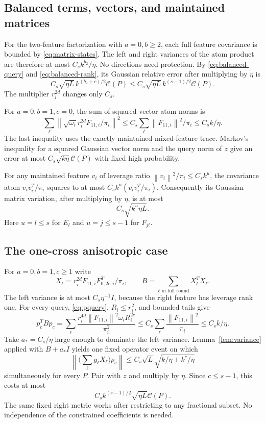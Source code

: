 \documentclass[11pt]{article}
\theoremstyle{remark}\newtheorem{remark}[theorem]{Remark}
\newcommand{\norm}[1]{\left\|#1\right\|}\newcommand{\ip}[2]{\left\langle #1,#2\right\rangle}
\newcommand{\cost}{\mathcal C}\newcommand{\OPT}{\mathsf{OPT}}
\begin{document}
\subsection{Balanced terms, vectors, and maintained matrices}
For the two-feature factorization with $a=0,b\ge2$, each full feature covariance is bounded by \eqref{eq:matrix-states}. The left and right variances of the atom product are therefore at most $C_s k^{b_2}/\eta$. No directions need protection. By \eqref{eq:balanced-query} and \eqref{eq:balanced-rank}, its Gaussian relative error after multiplying by $\eta$ is
\begin{equation}\label{eq:balanced-error}
 C_s\sqrt{\eta L}\,k^{(b_2+c)/2}\cost(P)
 \le C_s\sqrt{\eta L}\,k^{(s-1)/2}\cost(P).
\end{equation}
The multiplier $r_i^{2d}$ changes only $C_s$.

For $a=0,b=1,c=0$, the sum of squared vector-atom norms is
\[
 \sum_\ell\norm{\sqrt{\omega_i}r_i^{2d}F_{11,i}/\pi_i}^2
 \le C_s\sum_\ell\norm{F_{11,i}}^2/\pi_i\le C_s k/\eta.
\]
The last inequality uses the exactly maintained mixed-feature trace. Markov's inequality for a squared Gaussian vector norm and the query norm of $z$ give an error at most $C_s\sqrt{k\eta}\cost(P)$ with fixed high probability.

For any maintained feature $v_i$ of leverage ratio $\norm{v_i}^2/\pi_i\le C_s k^u$, the covariance atom $v_iv_i^T/\pi_i$ squares to at most $C_s k^u(v_iv_i^T/\pi_i)$. Consequently its Gaussian matrix variation, after multiplying by $\eta$, is at most
\begin{equation}\label{eq:state-drift}
 C_s\sqrt{k^u\eta L}.
\end{equation}
Here $u=l\le s$ for $E_l$ and $u=j\le s-1$ for $F_{jt}$.

\subsection{The one-cross anisotropic case}\label{sub:aniso}
For $a=0,b=1,c\ge1$ write
\[
 X_\ell=r_i^{2d}F_{11,i}F_{0,2c,i}^T/\pi_i,\qquad B=\sum_{\ell\text{ in full round}}X_\ell^TX_\ell.
\]
The left variance is at most $C_s\eta^{-1}I$, because the right feature has leverage rank one. For every query, \eqref{eq:pquery}, $R_i\le r_i^2$, and bounded tails give
\begin{equation}\label{eq:aniso-query}
 p_c^TBp_c
 =\sum_\ell\frac{r_i^{4d}\norm{F_{11,i}}^2\omega_iR_i^{2c}}{\pi_i^2}
 \le C_s\sum_\ell\frac{\norm{F_{11,i}}^2}{\pi_i}
 \le C_s k/\eta.
\end{equation}
Take $a_*=C_s/\eta$ large enough to dominate the left variance. Lemma~\ref{lem:variance} applied with $B+a_*I$ yields one fixed operator event on which
\[
 \norm{\bigl(\sum_\ell g_\ell X_\ell\bigr)p_c}
 \le C_s\sqrt{L}\sqrt{k/\eta+k^c/\eta}
\]
simultaneously for every $P$. Pair with $z$ and multiply by $\eta$. Since $c\le s-1$, this costs at most
\begin{equation}\label{eq:onecross-error}
 C_s k^{(s-1)/2}\sqrt{\eta L}\cost(P).
\end{equation}
The same fixed right metric works after restricting to any fractional subset. No independence of the constrained coefficients is needed.
\end{document}
